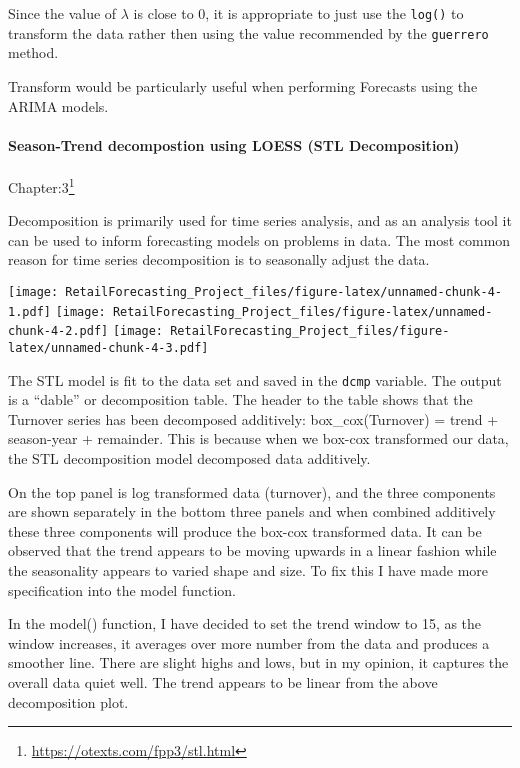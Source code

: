 \documentclass[
]{article}
\begin{document}
Since the value of \(\lambda\) is close to 0, it is appropriate to just
use the \texttt{log()} to transform the data rather then using the value
recommended by the \texttt{guerrero} method.

Transform would be particularly useful when performing Forecasts using
the ARIMA models.

\hypertarget{season-trend-decompostion-using-loess-stl-decomposition}{%
\paragraph{Season-Trend decompostion using LOESS (STL
Decomposition)}\label{season-trend-decompostion-using-loess-stl-decomposition}}

Chapter:3\footnote{\url{https://otexts.com/fpp3/stl.html}}

Decomposition is primarily used for time series analysis, and as an
analysis tool it can be used to inform forecasting models on problems in
data. The most common reason for time series decomposition is to
seasonally adjust the data.

\texttt{[image: RetailForecasting\_Project\_files/figure-latex/unnamed-chunk-4-1.pdf]}
\texttt{[image: RetailForecasting\_Project\_files/figure-latex/unnamed-chunk-4-2.pdf]}
\texttt{[image: RetailForecasting\_Project\_files/figure-latex/unnamed-chunk-4-3.pdf]}

The STL model is fit to the data set and saved in the \texttt{dcmp}
variable. The output is a ``dable'' or decomposition table. The header
to the table shows that the Turnover series has been decomposed
additively: box\_cox(Turnover) = trend + season-year + remainder. This
is because when we box-cox transformed our data, the STL decomposition
model decomposed data additively.

On the top panel is log transformed data (turnover), and the three
components are shown separately in the bottom three panels and when
combined additively these three components will produce the box-cox
transformed data. It can be observed that the trend appears to be moving
upwards in a linear fashion while the seasonality appears to varied
shape and size. To fix this I have made more specification into the
model function.

In the model() function, I have decided to set the trend window to 15,
as the window increases, it averages over more number from the data and
produces a smoother line. There are slight highs and lows, but in my
opinion, it captures the overall data quiet well. The trend appears to
be linear from the above decomposition plot.
\end{document}
